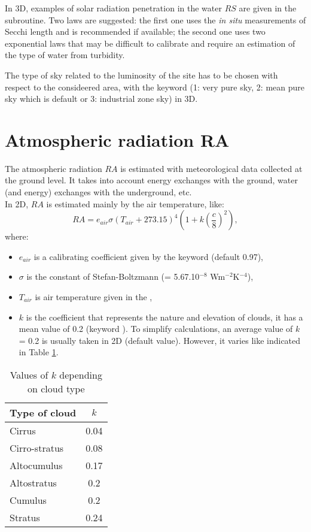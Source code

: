 In 3D, examples of solar radiation penetration in the water $RS$ are given in the
 subroutine. Two laws are suggested: the first one
uses the \emph{in situ} measurements of Secchi length and is
recommended if available; the second one uses two exponential laws that may be
difficult to calibrate and require an estimation of the type of water from
turbidity.

The type of sky related to the luminosity of the site has to be chosen
with respect to the consideered area, with the \waqtel keyword
 (1: very pure sky, 2: mean pure sky which is default
or 3: industrial zone sky) in 3D.


\section{Atmospheric radiation RA}

The atmospheric radiation $RA$ is estimated with meteorological
data collected at the ground level.
It takes into account energy exchanges with the ground, water
(and energy) exchanges with the underground, etc.\\

In 2D, $RA$ is estimated mainly by the air temperature, like:
\begin{equation*}
RA=e_{air}\sigma\left(T_{air}+273.15 \right)^4\left(1+k\left(\frac{c}{8}\right)^2 \right),
\end{equation*}
where:
\begin{itemize}
\item $e_{air}$ is a calibrating coefficient given by the keyword
   (default 0.97),
\item $\sigma$ is the constant of Stefan-Boltzmann (= 5.67.10${}^{-8}$ Wm${}^{-2}$K${}^{-4}$),
\item $T_{air}$ is air temperature given in the ,
\item $k$ is the coefficient that represents the nature and elevation of clouds,
it has a mean value of 0.2 (keyword ).
To simplify calculations, an average value of $k$ = 0.2 is usually taken in 2D
(default value).
However, it varies like indicated in Table \ref{tab:kcloud}.
\end{itemize}

\begin{table}
  \centering
  \begin{tabular}{|l|c|}
     \hline
     Type of cloud & $k$ \\
     \hline \hline
     Cirrus & 0.04 \\
     Cirro-stratus & 0.08 \\
     Altocumulus & 0.17 \\
     Altostratus & 0.2 \\
     Cumulus & 0.2 \\
     Stratus & 0.24\\
     \hline
   \end{tabular}
  \caption{Values of $k$ depending on cloud type}\label{tab:kcloud}
\end{table}

